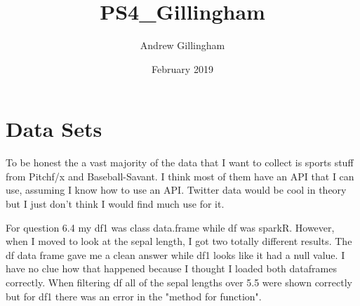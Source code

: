 \documentclass{article}
\title{PS4_Gillingham}
\author{Andrew Gillingham }
\date{February 2019}
\begin{document}
\maketitle

\section{Data Sets}

To be honest the a vast majority of the data that I want to collect is sports stuff from Pitchf/x and Baseball-Savant. I think most of them have an API that I can use, assuming I know how to use an API. Twitter data would be cool in theory but I just don't think I would find much use for it. 

For question 6.4 my df1 was class data.frame while df was sparkR. However, when I moved to look at the sepal length, I got two totally different results. The df data frame gave me a clean answer while df1 looks like it had a null value. I have no clue how that happened because I thought I loaded both dataframes correctly. When filtering df all of the sepal lengths over 5.5 were shown correctly but for df1 there was an error in the "method for function". 
\end{document}
